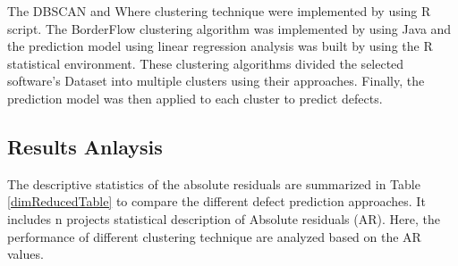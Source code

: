 \documentclass[12pt]{report}
\begin{document}
The DBSCAN \cite{ester1996density} and Where clustering technique \cite{menzies2011local,menzies2013local} were implemented by using R script. The BorderFlow clustering algorithm was implemented by using Java and the prediction model using linear regression analysis was built by using the R statistical environment. These clustering algorithms divided the selected software's Dataset into multiple clusters using their approaches. Finally, the prediction model was then applied to each cluster to predict defects. 



\subsection{Results Anlaysis}
The descriptive statistics of the absolute residuals are summarized in Table \ref{dimReducedTable} to compare the different defect prediction approaches. It includes n projects statistical description of Absolute residuals (AR). Here, the performance of different clustering technique are analyzed based on the AR values.
%
\end{document}
